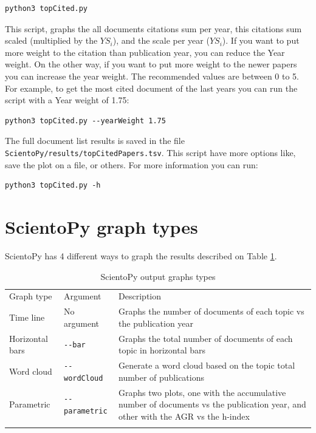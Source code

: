\documentclass[10pt,letterpaper]{article}
\begin{document}
\begin{verbatim}
python3 topCited.py
\end{verbatim}

This script, graphs the all documents citations sum per year, this citations sum scaled (multiplied by the $YS_i$), and the scale per year ($YS_i$). If you want to put more weight to the citation than publication year, you can reduce the Year weight. On the other way, if you want to put more weight to the newer papers you can increase the year weight. The recommended values are between 0 to 5. For example, to get the most cited document of the last years you can run the script with a Year weight of 1.75:

\begin{verbatim}
python3 topCited.py --yearWeight 1.75
\end{verbatim}


The full document list results is saved in the file \verb|ScientoPy/results/topCitedPapers.tsv|. This script have more options like, save the plot on a file, or others. For more information you can run:

\begin{verbatim}
python3 topCited.py -h
\end{verbatim}

\section{ScientoPy graph types}

ScientoPy has 4 different ways to graph the results described on Table \ref{table_graph_types}.

\begin{table}[h]
	\centering
	\caption{ScientoPy output graphs types}
	\label{table_graph_types}

	\begin{tabular}{ p{4cm} p{3cm} p{10cm}}
	\hline\noalign{\smallskip}
	Graph type     &  Argument & Description                             \\
	\noalign{\smallskip}\hline\noalign{\smallskip}                                                                         
	Time line      & No argument & Graphs the number of documents of each topic vs the publication year \\
	Horizontal bars  & \verb|--bar| & Graphs the total number of documents of each topic in horizontal bars \\
	Word cloud     & \verb|--wordCloud| & Generate a word cloud based on the topic total number of publications \\
	Parametric     & \verb|--parametric| & Graphs two plots, one with the accumulative number of documents vs the publication year, and other with the AGR vs the h-index\\
	\noalign{\smallskip}\hline
	\end{tabular}
\end{table}
\end{document}
